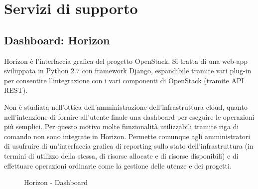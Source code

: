 \section{Servizi di supporto}
\subsection{Dashboard: Horizon}
Horizon è l'interfaccia grafica del progetto OpenStack.
Si tratta di una web-app sviluppata in Python 2.7 con framework Django, espandibile tramite vari plug-in per consentire l'integrazione con i vari componenti di OpenStack (tramite API REST).


Non è studiata nell'ottica dell'amministrazione dell'infrastruttura cloud, quanto nell'intenzione di fornire all'utente finale una dashboard per eseguire le operazioni più semplici. Per questo motivo molte funzionalità utilizzabili tramite riga di comando non sono integrate in Horizon.
Permette comunque agli amministratori di usufruire di un'interfaccia grafica di reporting sullo stato dell'infrastruttura (in termini di utilizzo della stessa, di risorse allocate e di risorse disponibili) e di effettuare operazioni ordinarie come la gestione delle utenze e dei progetti.
\begin{figure}[H]
\centering
{}
\caption{Horizon - Dashboard}\label{HorizonImg}
\end{figure}
